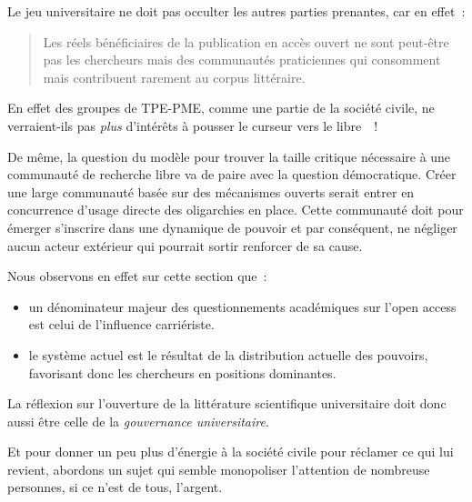 
Le jeu universitaire ne doit pas occulter les autres parties prenantes, car en effet~:
\blockcquote[traduction]{davis_open_2011}{
Les réels bénéficiaires de la publication en accès ouvert ne sont peut-être pas les chercheurs mais des communautés praticiennes qui consomment mais contribuent rarement au corpus littéraire.
}
En effet des groupes de TPE-PME, comme une partie de la société civile, ne verraient-ils pas \emph{plus} d'intérêts à pousser le curseur vers le libre~~!

De même, la question du modèle pour trouver la taille critique nécessaire à une communauté de recherche libre va de paire avec la question démocratique.
Créer une large communauté basée sur des mécanismes ouverts serait entrer en concurrence d'usage directe des oligarchies en place.
Cette communauté doit pour émerger s'inscrire dans une dynamique de pouvoir et par conséquent, ne négliger aucun acteur extérieur qui pourrait sortir renforcer de sa cause.

Nous observons en effet sur cette section que~:
\begin{itemize}
\item un dénominateur majeur des questionnements académiques sur l'open access est celui de l'influence carriériste.
\item le système actuel est le résultat de la distribution actuelle des pouvoirs, favorisant donc les chercheurs en positions dominantes.
\end{itemize}
La réflexion sur l'ouverture de la littérature scientifique universitaire doit donc aussi être celle de la \emph{gouvernance universitaire}.

Et pour donner un peu plus d'énergie à la société civile pour réclamer ce qui lui revient, abordons un sujet qui semble monopoliser l'attention de nombreuse personnes, si ce n'est de tous, l'argent.

